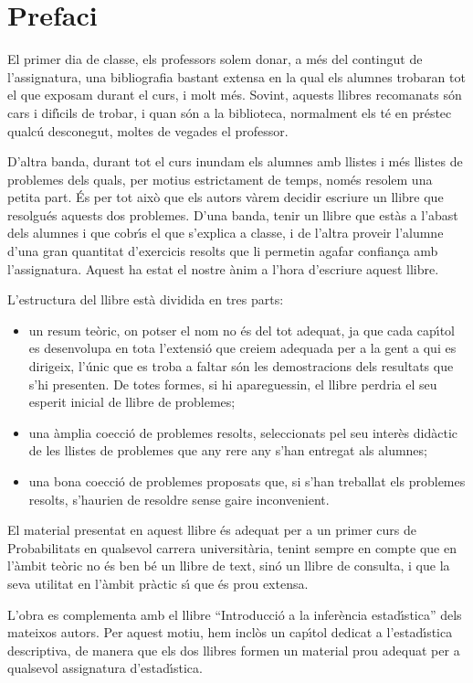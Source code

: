 \frontmatter
\chapter{Prefaci}

El primer dia de classe, els professors solem donar, a m\'es del
contingut de l'assignatura, una bibliografia bastant extensa 
en la qual els 
alumnes trobaran tot el que exposam durant el curs, i molt
m\'es. Sovint, aquests llibres recomanats s\'on cars i dif\'{\i}cils
de trobar, i quan s\'on a la biblioteca, normalment els t\'e en 
pr\'estec qualc\'u desconegut, moltes de vegades el professor.

D'altra banda, durant tot el curs inundam els alumnes amb llistes
i m\'es llistes de problemes dels quals, per motius estrictament
de temps, nom\'es  resolem una petita part. \'Es per tot aix\`o 
que els autors v\`arem decidir escriure un llibre que resolgu\'es  
aquests dos problemes. 
D'una banda, tenir un llibre que est\`as 
a l'abast dels alumnes i que cobr\'{\i}s el que s'explica a classe, 
i de l'altra proveir l'alumne d'una gran quantitat   
d'exercicis resolts que li permetin agafar confian\c{c}a amb  
l'assignatura. Aquest ha estat el nostre \`anim a l'hora    
d'escriure aquest llibre.

L'estructura del llibre est\`a dividida en tres parts:
\begin{itemize}
\item[a)] un resum te\`oric, on potser el nom no \'es del tot
adequat, ja que cada cap\'{\i}tol es desenvolupa en tota 
l'extensi\'o que creiem adequada per a la gent a qui es dirigeix,
l'\'unic que es troba a faltar s\'on les demostracions dels 
resultats que s'hi presenten. De totes formes, si hi apareguessin,
el llibre perdria el seu esperit inicial de llibre de problemes;
   
\item[b)] una \`amplia co{\lgem}ecci\'o de problemes resolts,   
seleccionats pel seu inter\`es did\`actic de les llistes de
problemes que any rere any s'han entregat als alumnes;

\item[c)] una bona co{\lgem}ecci\'o de problemes proposats
que, si s'han treballat els problemes resolts, s'haurien de
resoldre sense gaire inconvenient.
\end{itemize}

El material presentat en aquest llibre \'es adequat per a un
primer curs de Probabilitats en qualsevol carrera universit\`aria,
tenint sempre en compte que en l'\`ambit te\`oric no \'es ben b\'e
un llibre de text, sin\'o un llibre de consulta, i que la seva
utilitat en l'\`ambit pr\`actic s\'{\i} que \'es prou extensa.

L'obra es complementa amb el llibre ``Introducci\'o a la infer\`encia 
estad\'{\i}stica''
dels mateixos autors. Per aquest motiu, hem incl\`os
un cap\'{\i}tol dedicat a l'estad\'{\i}stica descriptiva, de manera que
els dos llibres formen
un material prou adequat per a qualsevol assignatura 
d'estad\'{\i}stica.
\cleardoublepage
\renewcommand{\contentsname}{Sumari}
\tableofcontents
\listoffigures
\mainmatter
